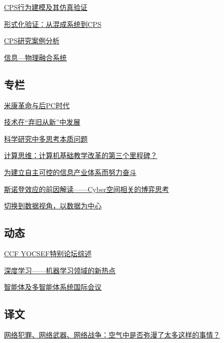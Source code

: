 \documentclass[a4paper]{article}
\begin{document}
\href{http://history.ccf.org.cn/resources/1190201776262/2013/07/19/2.pdf}{CPS行为建模及其仿真验证}

\href{http://history.ccf.org.cn/resources/1190201776262/2013/07/19/3.pdf}{形式化验证：从混成系统到CPS}

\href{http://history.ccf.org.cn/resources/1190201776262/2013/07/19/4.pdf}{CPS研究案例分析}

\href{http://history.ccf.org.cn/resources/1190201776262/2013/07/19/0.pdf}{信息—物理融合系统}

\subsection{专栏}
\href{http://history.ccf.org.cn/resources/1190201776262/2013/07/19/10.pdf}{米康革命与后PC时代}

\href{http://history.ccf.org.cn/resources/1190201776262/2013/07/19/11.pdf}{技术在“弃旧从新”中发展}

\href{http://history.ccf.org.cn/resources/1190201776262/2013/07/19/6.pdf}{科学研究中多思考本质问题}

\href{http://history.ccf.org.cn/resources/1190201776262/2013/07/19/8.pdf}{计算思维：计算机基础教学改革的第三个里程碑？}

\href{http://history.ccf.org.cn/resources/1190201776262/2013/07/19/9.pdf}{为建立自主可控的信息产业体系而努力奋斗}

\href{http://history.ccf.org.cn/resources/1190201776262/2013/07/15/5.pdf}{斯诺登效应的前因解读——Cyber空间相关的博弈思考}

\href{http://history.ccf.org.cn/resources/1190201776262/2013/07/19/7.pdf}{切换到数据视角，以数据为中心}

\subsection{动态}
\href{http://history.ccf.org.cn/resources/1190201776262/2013/07/19/14.pdf}{CCF YOCSEF特别论坛综述}

\href{http://history.ccf.org.cn/resources/1190201776262/2013/07/19/12.pdf}{深度学习——机器学习领域的新热点}

\href{http://history.ccf.org.cn/resources/1190201776262/2013/07/19/13.pdf}{智能体及多智能体系统国际会议}

\subsection{译文}
\href{http://history.ccf.org.cn/resources/1190201776262/2013/07/19/15.pdf}{网络犯罪、网络武器、网络战争：空气中是否弥漫了太多这样的事情？}
\end{document}

